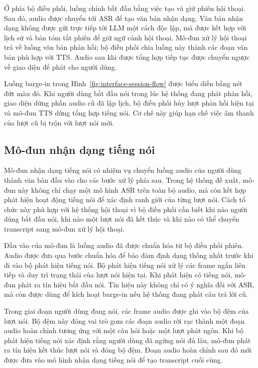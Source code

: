 \documentclass[a4paper,13pt,twoside]{report}
\begin{document}
Ở phía bộ điều phối, luồng chính bắt đầu bằng việc tạo và giữ phiên hội thoại. Sau đó, audio được chuyển tới ASR để tạo văn bản nhận dạng. Văn bản nhận dạng không được gửi trực tiếp tới LLM một cách độc lập, mà được kết hợp với lịch sử và bản tóm tắt phiên để giữ ngữ cảnh hội thoại. Mô-đun xử lý hội thoại trả về luồng văn bản phản hồi; bộ điều phối chia luồng này thành các đoạn văn bản phù hợp với TTS. Audio sau khi được tổng hợp tiếp tục được chuyển ngược về giao diện để phát cho người dùng.

Luồng barge-in trong Hình~\ref{fig:interface-session-flow} được biểu diễn bằng nét đứt màu đỏ. Khi người dùng bắt đầu nói trong lúc hệ thống đang phát phản hồi, giao diện dừng phần audio cũ đã lập lịch, bộ điều phối hủy lượt phản hồi hiện tại và mô-đun TTS dừng tổng hợp tiếng nói. Cơ chế này giúp hạn chế việc âm thanh của lượt cũ bị trộn với lượt nói mới.

\subsection{Mô-đun nhận dạng tiếng nói}

Mô-đun nhận dạng tiếng nói có nhiệm vụ chuyển luồng audio của người dùng thành văn bản đầu vào cho các bước xử lý phía sau. Trong hệ thống đề xuất, mô-đun này không chỉ chạy một mô hình ASR trên toàn bộ audio, mà còn kết hợp phát hiện hoạt động tiếng nói để xác định ranh giới của từng lượt nói. Cách tổ chức này phù hợp với hệ thống hội thoại vì bộ điều phối cần biết khi nào người dùng bắt đầu nói, khi nào một lượt nói đã kết thúc và khi nào có thể chuyển transcript sang mô-đun xử lý hội thoại.

Đầu vào của mô-đun là luồng audio đã được chuẩn hóa từ bộ điều phối phiên. Audio được đưa qua bước chuẩn hóa để bảo đảm định dạng thống nhất trước khi đi vào bộ phát hiện tiếng nói. Bộ phát hiện tiếng nói xử lý các frame ngắn liên tiếp và duy trì trạng thái của lượt nói hiện tại. Khi phát hiện có tiếng nói, mô-đun phát ra tín hiệu bắt đầu nói. Tín hiệu này không chỉ có ý nghĩa đối với ASR, mà còn được dùng để kích hoạt barge-in nếu hệ thống đang phát câu trả lời cũ.

Trong giai đoạn người dùng đang nói, các frame audio được ghi vào bộ đệm của lượt nói. Bộ đệm này đóng vai trò gom các đoạn audio rời rạc thành một đoạn audio hoàn chỉnh tương ứng với một câu hỏi hoặc một lượt phát ngôn. Khi bộ phát hiện tiếng nói xác định rằng người dùng đã ngừng nói đủ lâu, mô-đun phát ra tín hiệu kết thúc lượt nói và đóng bộ đệm. Đoạn audio hoàn chỉnh sau đó mới được đưa vào mô hình nhận dạng tiếng nói để tạo transcript cuối cùng.
\end{document}
